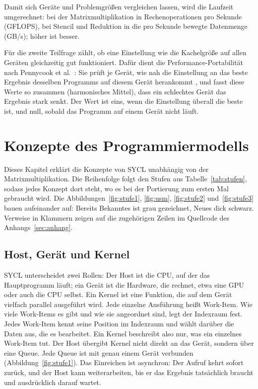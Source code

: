 \documentclass[12pt,a4paper]{article}
\begin{document}
Damit sich Geräte und Problemgrößen vergleichen lassen, wird die Laufzeit
umgerechnet: bei der Matrixmultiplikation in Rechenoperationen pro Sekunde
(GFLOPS), bei Stencil und Reduktion in die pro Sekunde bewegte Datenmenge (GB/s);
höher ist besser.

Für die zweite Teilfrage zählt, ob eine Einstellung wie die Kachelgröße auf allen
Geräten gleichzeitig gut funktioniert. Dafür dient die
Performance-Portabilität nach Pennycook et al.\ \cite{pennycook2016metric}: Sie
prüft je Gerät, wie nah die Einstellung an das beste Ergebnis desselben Programms
auf diesem Gerät herankommt \cite{pennycook2019implications}, und fasst diese
Werte so zusammen (harmonisches Mittel), dass ein schlechtes Gerät das Ergebnis
stark senkt. Der Wert ist eins, wenn die Einstellung überall die beste ist, und
null, sobald das Programm auf einem Gerät nicht läuft.

\section{Konzepte des Programmiermodells}\label{sec:konzepte}

Dieses Kapitel erklärt die Konzepte von SYCL unabhängig von der
Matrixmultiplikation. Die Reihenfolge folgt den Stufen aus
Tabelle~\ref{tab:stufen}, sodass jedes Konzept dort steht, wo es bei der
Portierung zum ersten Mal gebraucht wird. Die Abbildungen~\ref{fig:stufe1},
\ref{fig:usm}, \ref{fig:stufe2} und~\ref{fig:stufe3} bauen aufeinander auf:
Bereits Bekanntes ist grau gezeichnet, Neues dick schwarz. Verweise in
Klammern zeigen auf die zugehörigen Zeilen im Quellcode des Anhangs~\ref{sec:anhang}.

\subsection{Host, Gerät und Kernel}\label{sec:k-grundlagen}

SYCL unterscheidet zwei Rollen: Der Host ist die CPU, auf der das
Hauptprogramm läuft; ein Gerät ist die Hardware, die rechnet, etwa eine GPU
oder auch die CPU selbst. Ein Kernel ist eine Funktion, die auf dem Gerät
vielfach parallel ausgeführt wird. Jede einzelne Ausführung heißt Work-Item. Wie
viele Work-Items es gibt und wie sie angeordnet sind, legt der Indexraum fest.
Jedes Work-Item kennt seine Position im Indexraum und wählt darüber die Daten
aus, die es bearbeitet. Ein Kernel beschreibt also nur, was ein einzelnes
Work-Item tut. Der Host übergibt Kernel nicht direkt an das Gerät, sondern
über eine Queue. Jede Queue ist mit genau einem Gerät verbunden
(Abbildung~\ref{fig:stufe1}). Das Einreichen ist asynchron: Der Aufruf kehrt
sofort zurück, und der Host kann weiterarbeiten, bis er das Ergebnis tatsächlich
braucht und ausdrücklich darauf wartet.
\end{document}
